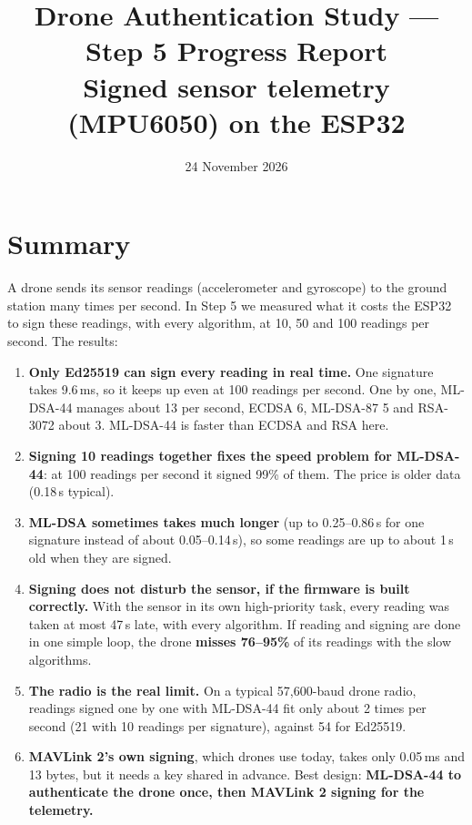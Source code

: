 \documentclass[10pt,a4paper]{article}
\title{Drone Authentication Study --- Step 5 Progress Report\\[3pt]
\large Signed sensor telemetry (MPU6050) on the ESP32}
\author{}
\date{24 November 2026}
\begin{document}
\maketitle

\section*{Summary}

A drone sends its sensor readings (accelerometer and gyroscope) to the ground station many times
per second. In Step 5 we measured what it costs the ESP32 to sign these readings, with every
algorithm, at 10, 50 and 100 readings per second. The results:

\begin{enumerate}[nosep]
  \item \textbf{Only Ed25519 can sign every reading in real time.} One signature takes 9.6\,ms, so it
        keeps up even at 100 readings per second. One by one, ML-DSA-44 manages about 13 per second,
        ECDSA 6, ML-DSA-87 5 and RSA-3072 about 3. ML-DSA-44 is faster than ECDSA and RSA here.
  \item \textbf{Signing 10 readings together fixes the speed problem for ML-DSA-44}: at 100 readings
        per second it signed 99\% of them. The price is older data (0.18\,s typical).
  \item \textbf{ML-DSA sometimes takes much longer} (up to 0.25--0.86\,s for one signature instead
        of about 0.05--0.14\,s), so some readings are up to about 1\,s old when they are signed.
  \item \textbf{Signing does not disturb the sensor, if the firmware is built correctly.} With the
        sensor in its own high-priority task, every reading was taken at most 47\,\textmu s late,
        with every algorithm. If reading and signing are done in one simple loop, the drone
        \textbf{misses 76--95\%} of its readings with the slow algorithms.
  \item \textbf{The radio is the real limit.} On a typical 57,600-baud drone radio, readings signed one
        by one with ML-DSA-44 fit only about 2 times per second (21 with 10 readings per signature),
        against 54 for Ed25519.
  \item \textbf{MAVLink 2's own signing}, which drones use today, takes only 0.05\,ms and 13 bytes, but
        it needs a key shared in advance. Best design: \textbf{ML-DSA-44 to authenticate the drone once,
        then MAVLink 2 signing for the telemetry.}
\end{enumerate}
\end{document}
